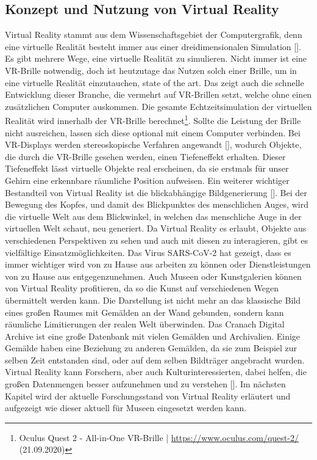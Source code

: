 \documentclass[a4paper,12pt,oneside]{article}
\begin{document}
    \subsection{Konzept und Nutzung von Virtual Reality} \label{Konzept und Nutzung von VR}
      Virtual Reality stammt aus dem Wissenschaftsgebiet der Computergrafik, denn eine
      virtuelle Realität besteht immer aus einer dreidimensionalen Simulation [\cite[13]{Dorner2013}].
      Es gibt mehrere Wege, eine virtuelle Realität zu simulieren. Nicht immer ist eine 
      VR-Brille notwendig, doch ist heutzutage das Nutzen solch einer Brille, um in eine 
      virtuelle Realität einzutauchen, state of the art. Das zeigt auch die schnelle 
      Entwicklung dieser Branche, die vermehrt auf VR-Brillen setzt, welche ohne einen
      zusätzlichen Computer auskommen. Die gesamte Echtzeitsimulation der virtuellen
      Realität wird innerhalb der VR-Brille berechnet\footnote{Oculus Quest 2 - All-in-One VR-Brille | \url{https://www.oculus.com/quest-2/} (21.09.2020)}.
      Sollte die Leistung der Brille nicht ausreichen, lassen sich diese optional mit einem
      Computer verbinden. Bei VR-Displays werden stereoskopische Verfahren angewandt [\cite[13]{Dorner2013}],
      wodurch Objekte, die durch die VR-Brille gesehen werden, einen Tiefeneffekt erhalten.
      Dieser Tiefeneffekt lässt virtuelle Objekte real erscheinen, da sie erstmals für unser
      Gehirn eine erkennbare räumliche Position aufweisen. Ein weiterer wichtiger
      Bestandteil von Virtual Reality ist die blickabhängige Bildgenerierung [\cite[13]{Dorner2013}].
      Bei der Bewegung des Kopfes, und damit des Blickpunktes des menschlichen Auges, wird
      die virtuelle Welt aus dem Blickwinkel, in welchen das
      menschliche Auge in der virtuellen Welt schaut, neu generiert. Da Virtual Reality 
      es erlaubt, Objekte
      aus verschiedenen Perspektiven zu sehen und auch mit diesen zu interagieren, gibt
      es vielfältige Einsatzmöglichkeiten. Das Virus SARS-CoV-2 hat gezeigt, dass es
      immer wichtiger wird von zu Hause aus arbeiten zu können oder Dienstleistungen von
      zu Hause aus entgegenzunehmen. Auch Museen oder Kunstgalerien können von
      Virtual Reality profitieren, da so die Kunst auf verschiedenen
      Wegen übermittelt werden kann. Die Darstellung ist nicht mehr an das klassische Bild 
      eines großen
      Raumes mit Gemälden an der Wand gebunden, sondern kann räumliche Limitierungen der
      realen Welt überwinden. Das Cranach Digital Archive ist eine große Datenbank mit
      vielen Gemälden und Archivalien. Einige Gemälde haben eine Beziehung zu anderen 
      Gemälden, da sie zum Beispiel zur selben Zeit entstanden sind, oder auf dem selben
      Bildträger angebracht wurden. Virtual Reality kann Forschern, aber auch 
      Kulturinteressierten, dabei helfen, die großen Datenmengen besser aufzunehmen und
      zu verstehen [\cite[9]{Dorner2013}]. Im nächsten Kapitel wird der aktuelle
      Forschungsstand von Virtual Reality erläutert und aufgezeigt wie dieser 
      aktuell für Museen eingesetzt werden kann.
\end{document}
